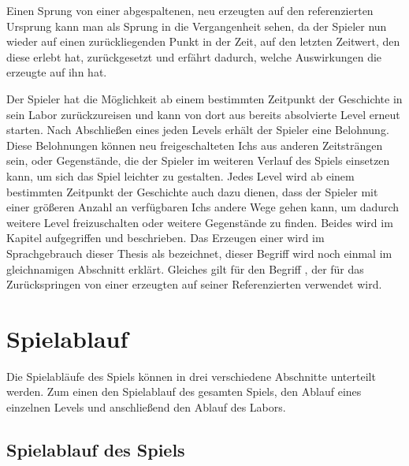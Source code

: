 Einen Sprung von einer abgespaltenen, neu erzeugten  auf den referenzierten Ursprung kann man als Sprung in die Vergangenheit sehen, da der Spieler nun wieder auf einen zurückliegenden Punkt in der Zeit, auf den letzten Zeitwert, den diese  erlebt hat, zurückgesetzt und erfährt dadurch, welche Auswirkungen die erzeugte  auf ihn hat.

Der Spieler hat die Möglichkeit ab einem bestimmten Zeitpunkt der Geschichte in sein Labor zurückzureisen und kann von dort aus bereits absolvierte Level erneut starten. Nach Abschließen eines jeden Levels erhält der Spieler eine Belohnung. Diese Belohnungen können neu freigeschalteten Ichs aus anderen Zeitsträngen sein, oder Gegenstände, die der Spieler im weiteren Verlauf des Spiels einsetzen kann, um sich das Spiel leichter zu gestalten. Jedes Level wird ab einem bestimmten Zeitpunkt der Geschichte auch dazu dienen, dass der Spieler mit einer größeren Anzahl an verfügbaren Ichs andere Wege gehen kann, um dadurch weitere Level freizuschalten oder weitere Gegenstände zu finden. Beides wird im Kapitel  aufgegriffen und beschrieben.
Das Erzeugen einer  wird im Sprachgebrauch dieser Thesis als  bezeichnet, dieser Begriff wird noch einmal im gleichnamigen Abschnitt erklärt. Gleiches gilt für den Begriff , der für das Zurückspringen von einer erzeugten  auf seiner Referenzierten  verwendet wird.

\section{Spielablauf}
Die Spielabläufe des Spiels können in drei verschiedene Abschnitte unterteilt werden. Zum einen den Spielablauf des gesamten Spiels, den Ablauf eines einzelnen Levels und anschließend den Ablauf des Labors.

\subsection{Spielablauf des Spiels}

